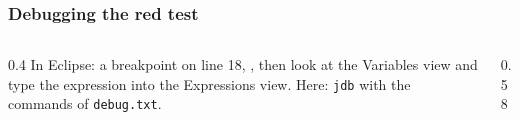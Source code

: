 \documentclass[aspectratio=169,10pt,compress]{beamer}
\begin{document}
\begin{frame}[t,fragile] \frametitle{Debugging the red test}
  \begin{columns}[T]
    \begin{column}{0.4\textwidth}
      \small In Eclipse: a breakpoint on line 18, , then look at the Variables view and
      type the expression into the Expressions view. Here: \texttt{jdb} with the commands of \texttt{debug.txt}.
    \end{column}
    \begin{column}{0.58\textwidth}
    \end{column}
  \end{columns}
\end{frame}
\end{document}
